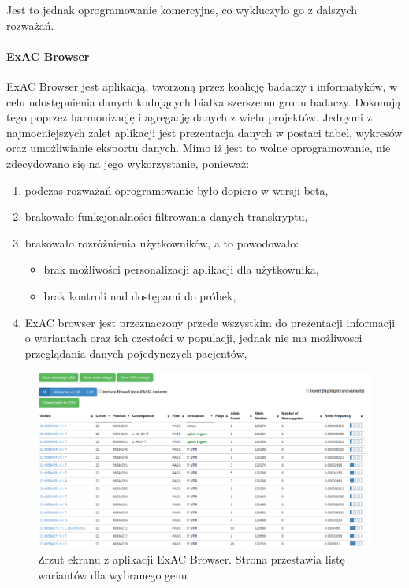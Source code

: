 \documentclass[a4paper,12pt,twoside]{article}
\begin{document}
Jest to jednak oprogramowanie komercyjne, co wykluczyło go z dalszych
rozważań.

\paragraph{ExAC Browser} ExAC Browser jest aplikacją, tworzoną przez koalicję badaczy i informatyków, w celu
udostępnienia danych kodujących białka szerszemu gronu badaczy.
Dokonują tego poprzez harmonizację i agregację danych z wielu projektów.
Jednymi z najmocniejszych zalet aplikacji jest prezentacja danych w postaci tabel, wykresów oraz umożliwianie eksportu danych.
Mimo iż jest to wolne oprogramowanie, nie zdecydowano się na jego wykorzystanie, ponieważ:
\begin{enumerate}[1)]
\item podczas rozważań oprogramowanie było dopiero w wersji beta,
\item brakowało funkcjonalności filtrowania danych transkryptu,
\item brakowało rozróżnienia użytkowników, a to powodowało:
\begin{itemize}
\item brak możliwości personalizacji aplikacji dla użytkownika,
\item brak kontroli nad dostępami do próbek,
\end{itemize}
\item ExAC browser jest przeznaczony przede wszystkim do prezentacji informacji o wariantach oraz ich czestości w populacji, jednak nie ma możliwosci przeglądania danych pojedynczych pacjentów,
\end{enumerate}

\begin{figure}[H]
\includegraphics[width=0.9\linewidth]{obrazy/exac/broad.png}
\caption{Zrzut ekranu z aplikacji ExAC Browser. Strona przestawia listę wariantów dla wybranego genu}
\label{fig:broadpic}
\end{figure}
\end{document}
